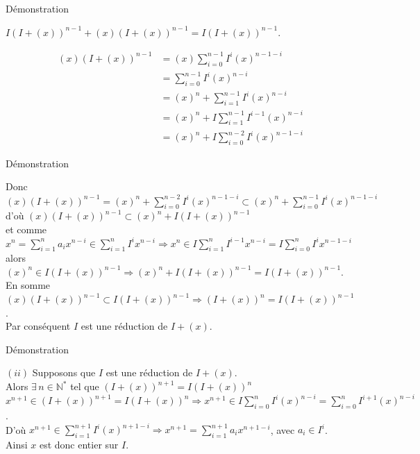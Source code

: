 \documentclass[11pt,a4paper]{beamer}
\begin{document}
			\begin{frame}{Démonstration}
		\begin{block}{}
			\begin{center}
				$I(I+(x))^{n-1} + (x)(I+(x))^{n-1} = I(I+(x))^{n-1}$.
			\end{center}
			\begin{align*}
				(x)(I+(x))^{n-1} &= (x)\displaystyle \sum_{i=0}^{n-1}{I^i (x)^{n-1-i}}\\
				&= \displaystyle \sum_{i=0}^{n-1}{I^i (x)^{n-i}}\\
				&= (x)^n + \displaystyle \sum_{i=1}^{n-1}{I^i (x)^{n-i}}\\
				&= (x)^n + I\displaystyle \sum_{i=1}^{n-1}{I^{i-1} (x)^{n-i}}\\
				&= (x)^n + I\displaystyle \sum_{i=0}^{n-2}{I^i (x)^{n-1-i}}
			\end{align*}
		\end{block}
	\end{frame}
				\begin{frame}{Démonstration}
		\begin{block}{}
			Donc $(x)(I+(x))^{n-1} = (x)^n + \displaystyle \sum_{i=0}^{n-2}{I^i (x)^{n-1-i}} \subset (x)^n + \displaystyle \sum_{i=0}^{n-1}{I^i (x)^{n-1-i}}$\\
			d'où $(x)(I+(x))^{n-1} \subset (x)^n + I(I+(x))^{n-1}$\\ et comme $x^n = \displaystyle \sum_{i=1}^{n}{a_i x^{n-i}} \in \displaystyle \sum_{i=1}^{n}{I^i x^{n-i}} \Rightarrow x^n \in I\displaystyle \sum_{i=1}^{n}{I^{i-1} x^{n-i}} = I\displaystyle \sum_{i=0}^{n}{I^i x^{n-1-i}}$\\
			alors $(x)^n \in I(I+(x))^{n-1} \Rightarrow (x)^n + I(I+(x))^{n-1} = I(I+(x))^{n-1}$.\\
			En somme $(x)(I+(x))^{n-1} \subset I(I+(x))^{n-1} \Rightarrow (I+(x))^{n} = I(I+(x))^{n-1}$.\\
			Par conséquent $I$ est une réduction de $I + (x)$.
		\end{block}
	\end{frame}
	
					\begin{frame}{Démonstration}
		\begin{block}{}
				$(ii)$ Supposons que $I$ est une réduction de $I + (x)$.\\
			Alors $\exists \, n \in \mathbb{N^*}$ tel que $(I + (x))^{n+1} = I(I + (x))^{n}$
			$x^{n+1} \in (I + (x))^{n+1} = I(I + (x))^{n} \Rightarrow x^{n+1} \in I\displaystyle \sum_{i=0}^{n}{I^i (x)^{n-i}} = \displaystyle \sum_{i=0}^{n}{I^{i+1} (x)^{n-i}}$.\\
			D'où $x^{n+1} \in \displaystyle \sum_{i=1}^{n+1}{I^i (x)^{n+1-i}} \Rightarrow x^{n+1} =  \displaystyle \sum_{i=1}^{n+1}{a_i x^{n+1-i}}$, avec $a_i \in I^i$.\\ Ainsi $x$ est donc entier sur $I$.
		\end{block}
	\end{frame}
	
\end{document}
